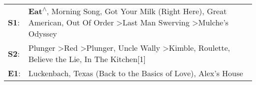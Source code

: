 \begin{supertabular}{p{0.03\textwidth}p{0.92\textwidth}}
 \textbf{S1}:  &  \textbf{Eat\textsuperscript{$\wedge$}}, \enspace Morning Song\textsuperscript{}, \enspace Got Your Milk (Right Here)\textsuperscript{}, \enspace Great American\textsuperscript{}, \enspace Out Of Order\textsuperscript{} \textgreater \enspace Last Man Swerving\textsuperscript{} \textgreater \enspace Mulche's Odyssey\textsuperscript{}  \enspace  \\
 \textbf{S2}:  &    Plunger\textsuperscript{} \textgreater \enspace Red\textsuperscript{} \textgreater \enspace Plunger\textsuperscript{}, \enspace Uncle Wally\textsuperscript{} \textgreater \enspace Kimble\textsuperscript{}, \enspace Roulette\textsuperscript{}, \enspace Believe the Lie\textsuperscript{}, \enspace In The Kitchen[1]\textsuperscript{}  \enspace  \\
 \textbf{E1}:  &                                                                                                                                                                                                                                      Luckenbach, Texas (Back to the Basics of Love)\textsuperscript{}, \enspace Alex's House\textsuperscript{}  \enspace  \\
\end{supertabular}
